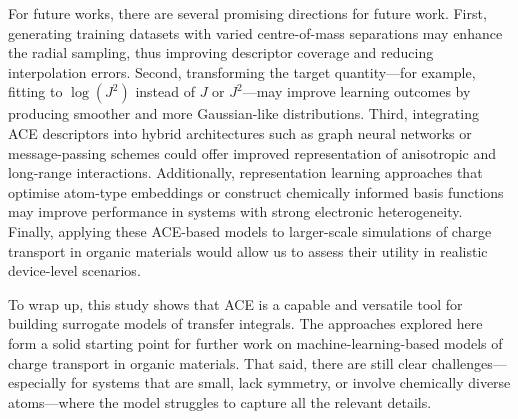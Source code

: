 For future works, there are several promising directions for future work. First, generating training datasets with varied centre-of-mass separations may enhance the radial sampling, thus improving descriptor coverage and reducing interpolation errors. Second, transforming the target quantity—for example, fitting to $\log(J^2)$ instead of $J$ or $J^2$—may improve learning outcomes by producing smoother and more Gaussian-like distributions. Third, integrating ACE descriptors into hybrid architectures such as graph neural networks or message-passing schemes \cite{https://doi.org/10.48550/arxiv.2206.07697, Batatia2025} could offer improved representation of anisotropic and long-range interactions. Additionally, representation learning approaches that optimise atom-type embeddings or construct chemically informed basis functions may improve performance in systems with strong electronic heterogeneity. Finally, applying these ACE-based models to larger-scale simulations of charge transport in organic materials would allow us to assess their utility in realistic device-level scenarios.

To wrap up, this study shows that ACE is a capable and versatile tool for building surrogate models of transfer integrals. The approaches explored here form a solid starting point for further work on machine-learning-based models of charge transport in organic materials. That said, there are still clear challenges—especially for systems that are small, lack symmetry, or involve chemically diverse atoms—where the model struggles to capture all the relevant details.